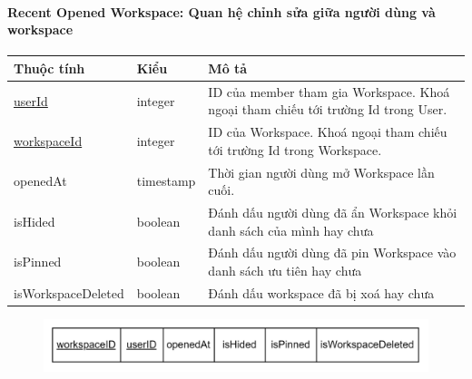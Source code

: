 \paragraph{Recent Opened Workspace: Quan hệ chỉnh sửa giữa người dùng và workspace}
\begin{center}
\begin{tabular}{ |p{3cm} |p{2cm} |p{9cm}|} 
 \hline
    Thuộc tính & Kiểu & Mô tả \\ [0.5ex] 
 \hline
 \underline{userId} & integer & ID của member tham gia Workspace. Khoá ngoại tham chiếu tới trường Id trong User. \\ 
 \hline
 \underline{workspaceId} & integer & ID của Workspace. Khoá ngoại tham chiếu tới trường Id trong Workspace. \\
 \hline
 openedAt & timestamp & Thời gian người dùng mở Workspace lần cuối.\\
 \hline
 isHided & boolean & Đánh dấu người dùng đã ẩn Workspace khỏi danh sách của mình hay chưa \\
 \hline
 isPinned & boolean & Đánh dấu người dùng đã pin Workspace vào danh sách ưu tiên hay chưa \\
 \hline
 isWorkspaceDeleted & boolean & Đánh dấu workspace đã bị xoá hay chưa \\
 \hline
\end{tabular}
\end{center}
\begin{figure}[h]
        \centering
        \includegraphics[width=\textwidth]{Content/Phân tích và thiết kế hệ thống/images/ERD_mapping/recent_opened_workspace_mapping.png}
        \label{fig:enter-label}
\end{figure}

